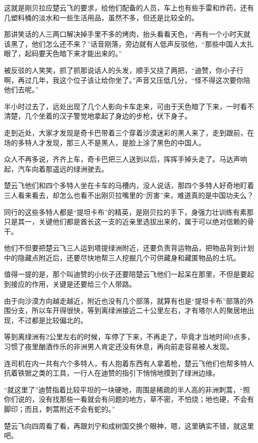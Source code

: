 这就是刚贝拉应楚云飞的要求，给他们配备的人员，车上也有些手雷和炸药，还有几塑料桶的淡水和一些生活用品，虽然不多，但还是比较全的。

那讲笑话的人三两口解决掉手里不多的烤肉，抬头看看天色，“再有一个小时天就该黑了，他们怎么还不来？”话音刚落，旁边就有人低声反驳他，“那些中国人太扎眼了，起码要天色暗下来才能出来的。”

被反驳的人笑笑，抓了抓那说话人的头发，顺手又挠了两把，“迪赞，你小子行啊，再过几年，我这个位子该让给你坐了。”声音又压低几分，“怪不得这次要你陪他们去呢。”

半小时过去了，远处出现了几个人影向卡车走来，可由于天色暗了下来，一时看不清楚，几个坐着的汉子警觉地拿起了身边的步枪，伏下身子。

走到近处，大家才发现是奇卡巴带着三个穿着沙漠迷彩的黑人来了，走到跟前，在场的多特人才发现，那三人不是黑人，是脸上涂了黑色的中国人。

众人不再多说，齐齐上车，奇卡巴把三人送到以后，挥挥手掉头走了。马达声响起，汽车向着那遥远的绿洲驶去。

楚云飞他们和四个多特人坐在卡车的马槽内，没人说话，那四个多特人好奇地盯着三人看来看去，却怎么也看不出刚贝拉嘴里的“厉害”来，难道真的是中国功夫么？

同行的这些多特人都是“提坦卡布”的精英，是刚贝拉的手下，身强力壮训练有素那只是其一，关键他们都是酋长这一支的近亲里选拔出来的，属于可以绝对信赖的骨干。

他们不但要把楚云飞三人运到塔提绿洲附近，还要负责背运物品，把物品背到计划中的隐藏点附近后，还要尽快地帮三人挖掘几个可供藏身和藏匿物品的土坑。

值得一提的是，那个叫迪赞的小伙子还要陪楚云飞他们一起呆在那里，不但是要起到接应的作用，关键是还要给三个人带路。

由于向沙漠方向越走越近，附近也没有几个部落，就算有也是“提坦卡布”部落的外围分支，所以车开得很快，等到离绿洲接近二十公里左右，才有塔尔人的聚居地出现，不过都是比较偏北的。

等到离绿洲有2公里左右的时候，车停了下来，不再走了，毕竟才当地时间9点多，习惯了夜里酗酒作乐的非洲男人肯定还没有休息，再向前走容易被人发现。

连司机在内一共有六个多特人，有人抱着东西有人拿着枪，楚云飞他们也帮多特人抗着铁锨之类的工具，一行人在迪赞的指引下悄悄地摸到了绿洲边缘。

“就这里了”迪赞指着比较平坦的一块硬地，周围是稀疏的半人高的非洲刺蒿，“照你们说的，没有找那些一看就会有问题的地方，草不密，不怕烧；地也硬，不会有脚印；而且，刺蒿附近不会有蛇的。”

楚云飞向四周看了看，再跟刘宁和成树国交换个眼神，嗯，这里确实不错，就这里吧。

